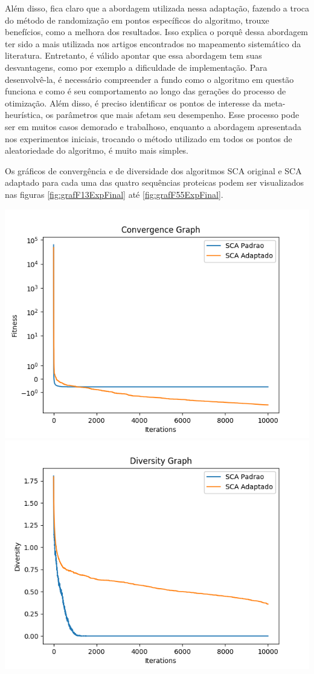 Além disso, fica claro que a abordagem utilizada nessa adaptação, fazendo a troca do método de randomização em pontos específicos do algoritmo, trouxe benefícios, como a melhora dos resultados. Isso explica o porquê dessa abordagem ter sido a mais utilizada nos artigos encontrados no mapeamento sistemático da literatura. Entretanto, é válido apontar que essa abordagem tem suas desvantagens, como por exemplo a dificuldade de implementação. Para desenvolvê-la, é necessário compreender a fundo como o algoritmo em questão funciona e como é seu comportamento ao longo das gerações do processo de otimização. Além disso, é preciso identificar os pontos de interesse da meta-heurística, os parâmetros que mais afetam seu desempenho. Esse processo pode ser em muitos casos demorado e trabalhoso, enquanto a abordagem apresentada nos experimentos iniciais, trocando o método utilizado em todos os pontos de aleatoriedade do algoritmo, é muito mais simples.

Os gráficos de convergência e de diversidade dos algoritmos SCA original e SCA adaptado para cada uma das quatro sequências proteicas podem ser visualizados nas figuras \ref{fig:grafF13ExpFinal} até \ref{fig:grafF55ExpFinal}.

{
    \centering
    \includegraphics[width=0.49\linewidth]{figuras/convF13_F.png}
    \includegraphics[width=0.49\linewidth]{figuras/divF13_F.png}
    \label{fig:grafF13ExpFinal}
}

